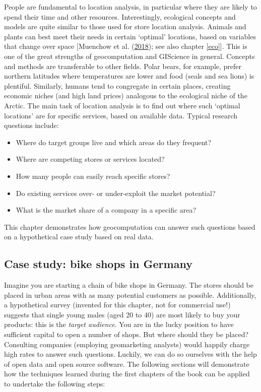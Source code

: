 \documentclass[]{krantz}
\providecommand{\tightlist}{%
  \setlength{\itemsep}{0pt}\setlength{\parskip}{0pt}}
\begin{document}
People are fundamental to location analysis, in particular where they are likely to spend their time and other resources.
Interestingly, ecological concepts and models are quite similar to those used for store location analysis.
Animals and plants can best meet their needs in certain `optimal' locations, based on variables that change over space {[}Muenchow et al. (\protect\hyperlink{ref-muenchow_review_2018}{2018}); see also chapter \ref{eco}{]}.
This is one of the great strengths of geocomputation and GIScience in general.
Concepts and methods are transferable to other fields.
Polar bears, for example, prefer northern latitudes where temperatures are lower and food (seals and sea lions) is plentiful.
Similarly, humans tend to congregate in certain places, creating economic niches (and high land prices) analogous to the ecological niche of the Arctic.
The main task of location analysis is to find out where such `optimal locations' are for specific services, based on available data.
Typical research questions include:

\begin{itemize}
\tightlist
\item
  Where do target groups live and which areas do they frequent?
\item
  Where are competing stores or services located?
\item
  How many people can easily reach specific stores?
\item
  Do existing services over- or under-exploit the market potential?
\item
  What is the market share of a company in a specific area?
\end{itemize}

This chapter demonstrates how geocomputation can answer such questions based on a hypothetical case study based on real data.

\hypertarget{case-study}{%
\subsection{Case study: bike shops in Germany}\label{case-study}}

Imagine you are starting a chain of bike shops in Germany.
The stores should be placed in urban areas with as many potential customers as possible.
Additionally, a hypothetical survey (invented for this chapter, not for commercial use!) suggests that single young males (aged 20 to 40) are most likely to buy your products: this is the \emph{target audience}.
You are in the lucky position to have sufficient capital to open a number of shops.
But where should they be placed?
Consulting companies (employing geomarketing analysts) would happily charge high rates to answer such questions.
Luckily, we can do so ourselves with the help of open data and open source software.
The following sections will demonstrate how the techniques learned during the first chapters of the book can be applied to undertake the following steps:
\end{document}
